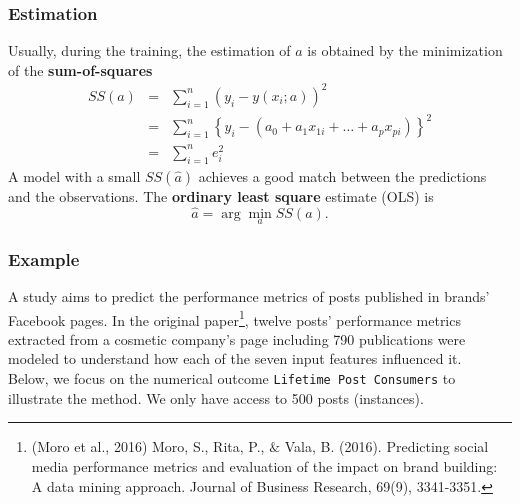 \begin{frame}
\frametitle{Estimation}
Usually, during the training, the estimation of $a$ is obtained by the minimization of the {\bf sum-of-squares}
\begin{eqnarray*}
SS(a) &=& \sum_{i=1}^n \left(y_i - y(x_i;a)\right)^2 \\
&=& \sum_{i=1}^n \left\{y_i - (a_0 + a_1 x_{1i} + \ldots + a_p x_{pi})\right\}^2\\
&=& \sum_{i=1}^n e_i^2
\end{eqnarray*}
A model with a small $SS(\hat{a})$ achieves a good match between the predictions and the observations. The {\bf ordinary least square} estimate (OLS) is
$$
\hat{a} = \arg\min_a SS(a).
$$
\end{frame}
\begin{frame}
\frametitle{Example}
A study aims to predict the performance metrics of posts published
in brands' Facebook pages. In the original paper\footnote{(Moro et al., 2016) Moro, S., Rita, P., $\&$ Vala, B. (2016). Predicting social media performance metrics and evaluation of the impact on brand building: A data mining approach. Journal of Business Research, 69(9), 3341-3351.}, twelve posts' performance metrics extracted from a cosmetic company's page including 790 publications were modeled to understand how each of the seven input features influenced it. \\
\vspace{0.2cm}
Below, we focus on the numerical outcome {\tt Lifetime Post Consumers} to illustrate the method. We only have access to 500 posts (instances).
\end{frame}
